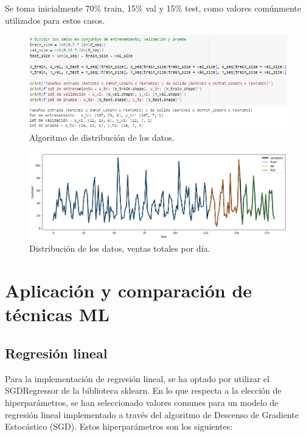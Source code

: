 Se toma inicialmente 70\% train, 15\% val y 15\% test, como valores comúnmente utilizados para estos casos.
\begin{figure}[H]
  \begin{center}
    \includegraphics[scale=0.75]{./divisionde _datos.jpg}
    \caption{Algoritmo de distribución de los datos.}
    \label{fig:distribucion_algoritmo}
  \end{center}
\end{figure}

\begin{figure}[H]
  \begin{center}
    \includegraphics[scale=0.40]{./serie_normal_dividida.png}
    \caption{Distribución de los datos, ventas totales por día.}
    \label{fig:distribucion_datos}
  \end{center}
\end{figure}



\section{Aplicación y comparación de técnicas ML}

\subsection{Regresión lineal}
Para la implementación de regresión lineal, se ha optado por utilizar el SGDRegressor de la biblioteca sklearn. En lo que respecta a la elección de hiperparámetros, se han seleccionado valores comunes para un modelo de regresión lineal implementado a través del algoritmo de Descenso de Gradiente Estocástico (SGD). Estos hiperparámetros son los siguientes:

